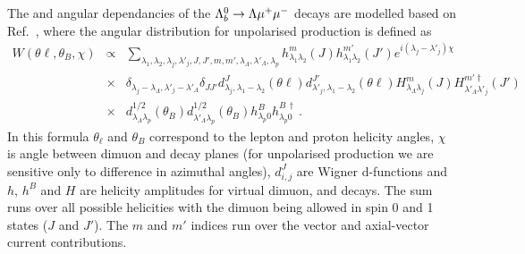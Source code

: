 The \qsq and angular dependancies of the $\Lambda^0_b\rightarrow\Lambda\mu^+\mu^-$ decays are modelled based on
Ref.~\cite{Gutsche:2013pp}, where the angular distribution for unpolarised \Lb production
is defined as
\begin{eqnarray}
W(\theta\ell,\theta_{B},\chi)  &\propto& 
\sum_{\lambda_1,\lambda_{2},\lambda_j,\lambda'_j,J,J',m,m',\lambda_{\Lambda},
\lambda'_{\Lambda},\lambda_{p}} 
h^{m}_{\lambda_1\lambda_2}(J)h^{m'}_{\lambda_1\lambda_2}(J')
e^{i(\lambda_{j}-\lambda'_{j})\chi}
\nonumber\\ 
&\times&
\delta_{\lambda_{j}-\lambda_{\Lambda},\lambda'_{j}-\lambda'_{\Lambda}}
\delta_{JJ'}
d^J_{\lambda_j,\lambda_1-\lambda_{2}}(\theta\ell)
d^{J'}_{\lambda'_j,\lambda_1-\lambda_{2}}(\theta\ell)
H^{m}_{\lambda_{\Lambda}\lambda_{j}}(J)
H^{m'\dagger}_{\lambda'_{\Lambda}\lambda'_{j}}(J')
\nonumber \\
&\times& 
d^{1/2}_{\lambda_{\Lambda}\lambda_{p}}(\theta_{B})
d^{1/2}_{\lambda'_{\Lambda}\lambda_{p}}(\theta_{B})
h^{B}_{\lambda_{p}0}h^{B\,\dagger}_{\lambda_{p}0}\,.
\end{eqnarray}
In this formula $\theta_\ell$ and $\theta_B$ correspond to the lepton and proton helicity angles, $\chi$ is angle between
dimuon and \Lz decay planes (for unpolarised production we are sensitive only to difference in
azimuthal angles), $d^J_{i,j}$ are Wigner d-functions and $h$, $h^B$ and $H$ are helicity amplitudes
for virtual dimuon, \Lz and \Lb decays. The sum runs over all possible helicities with the dimuon being
allowed in spin 0 and 1 states ($J$ and $J'$). The $m$ and $m'$ indices run over the vector %
and axial-vector %
current contributions.

